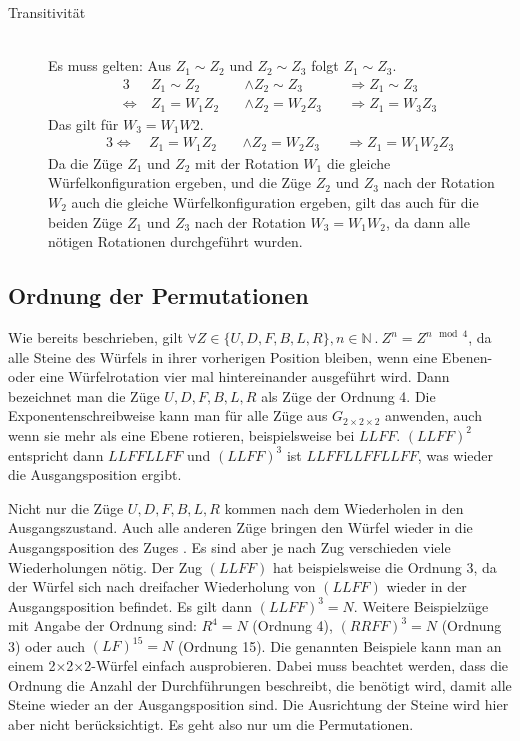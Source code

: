 \documentclass[12pt,a4paper, usenames, dvipsnames]{article}
\theoremstyle{mystyle}
\theoremstyle{definition}
\newcommand{\Gtwo}{\ensuremath{G_{2\times 2\times 2}}}
\newcommand{\Ttwo}{2$\times$2$\times$2-}
\begin{document}
\begin{description}
\item [Transitivität] \ \\
Es muss gelten: Aus $Z_1 \sim Z_2$ und $Z_2 \sim Z_3$ folgt $Z_1 \sim Z_3$.
\begin{alignat*}{3}
& Z_1 \sim Z_2 && \wedge Z_2 \sim Z_3 && \Rightarrow Z_1 \sim Z_3 \\
\Leftrightarrow \ & Z_1 = W_1Z_2 \ && \wedge Z_2 = W_2Z_3 \ && \Rightarrow Z_1 = W_3Z_3
\end{alignat*}
Das gilt für $W_3=W_1W2$.
\begin{alignat*}{3}
\Leftrightarrow \ & Z_1 = W_1Z_2 \ && \wedge Z_2 = W_2Z_3 \ && \Rightarrow Z_1 = W_1W_2Z_3 
\end{alignat*}
Da die Züge $Z_1$ und $Z_2$ mit der Rotation $W_1$ die gleiche Würfelkonfiguration ergeben, und die Züge $Z_2$ und $Z_3$ nach der Rotation $W_2$ auch die gleiche Würfelkonfiguration ergeben, gilt das auch für die beiden Züge $Z_1$ und $Z_3$ nach der Rotation $W_3=W_1W_2$, da dann alle nötigen Rotationen durchgeführt wurden.

\end{description}
%
%
%
%
%
%
%
%
%
%
%
%
%
%
%
%
%
%
%
%
\subsection*{Ordnung der Permutationen}
Wie bereits beschrieben, gilt $\forall Z \in \{ U, D, F, B, L, R \}, n \in \mathbb{N} \ . \ Z^n=Z^{n \mod 4}$, da alle Steine des Würfels in ihrer vorherigen Position bleiben, wenn eine Ebenen- oder eine Würfelrotation vier mal hintereinander ausgeführt wird. Dann bezeichnet man die Züge $U, D, F, B, L, R$ als Züge der Ordnung 4. 
Die Exponentenschreibweise kann man für alle Züge aus $\Gtwo$ anwenden, auch wenn sie mehr als eine Ebene rotieren, beispielsweise bei $LLFF$. $(LLFF)^2$ entspricht dann $LLFFLLFF$ und $(LLFF)^3$ ist $LLFFLLFFLLFF$, was wieder die Ausgangsposition ergibt. 

Nicht nur die Züge $U, D, F, B, L, R$ kommen nach dem Wiederholen in den Ausgangszustand. Auch alle anderen Züge bringen den Würfel wieder in die Ausgangsposition des Zuges \cite{TD}. Es sind aber je nach Zug verschieden viele Wiederholungen nötig. Der Zug $(LLFF)$ hat beispielsweise die Ordnung 3, da der Würfel sich nach dreifacher Wiederholung von $(LLFF)$ wieder in der Ausgangsposition befindet. Es gilt dann $(LLFF)^3 = N$.
Weitere Beispielzüge mit Angabe der Ordnung sind: ${R^4= N}$ (Ordnung 4), ${(RRFF)^3 = N}$ (Ordnung 3) oder auch ${(LF)^{15}=N}$ (Ordnung 15). 
Die genannten Beispiele kann man an einem \Ttwo Würfel einfach ausprobieren.
Dabei muss beachtet werden, dass die Ordnung die Anzahl der Durchführungen beschreibt, die benötigt wird, damit alle Steine wieder an der Ausgangsposition sind. Die Ausrichtung der Steine wird hier aber nicht berücksichtigt. Es geht also nur um die Permutationen.
\end{document}
